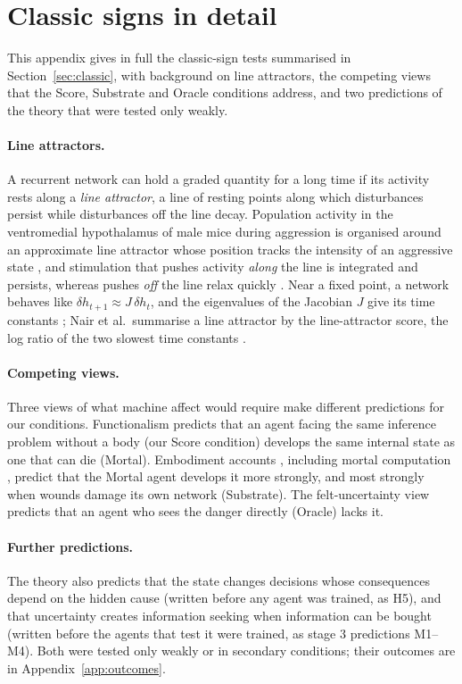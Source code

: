 \documentclass[11pt]{article}
\begin{document}
\section{Classic signs in detail}
\label{app:classic}

This appendix gives in full the classic-sign tests summarised in Section~\ref{sec:classic}, with background on line attractors, the competing views that the Score, Substrate and Oracle conditions address, and two predictions of the theory that were tested only weakly.

\paragraph{Line attractors.} A recurrent network can hold a graded quantity for a long time if its activity rests along a \emph{line attractor}, a line of resting points along which disturbances persist while disturbances off the line decay. Population activity in the ventromedial hypothalamus of male mice during aggression is organised around an approximate line attractor whose position tracks the intensity of an aggressive state \cite{nair2023line}, and stimulation that pushes activity \emph{along} the line is integrated and persists, whereas pushes \emph{off} the line relax quickly \cite{vinograd2024causal}. Near a fixed point, a network behaves like $\delta h_{t+1}\approx J\,\delta h_t$, and the eigenvalues of the Jacobian $J$ give its time constants \cite{sussillo2013opening}; Nair et al.\ summarise a line attractor by the line-attractor score, the log ratio of the two slowest time constants \cite{nair2023line}.

\paragraph{Competing views.} Three views of what machine affect would require make different predictions for our conditions. Functionalism predicts that an agent facing the same inference problem without a body (our Score condition) develops the same internal state as one that can die (Mortal). Embodiment accounts \cite{damasio1994descartes,seth2016active,man2019homeostasis}, including mortal computation \cite{ororbia2023mortal}, predict that the Mortal agent develops it more strongly, and most strongly when wounds damage its own network (Substrate). The felt-uncertainty view \cite{solms2026inferring} predicts that an agent who sees the danger directly (Oracle) lacks it.

\paragraph{Further predictions.} The theory also predicts that the state changes decisions whose consequences depend on the hidden cause (written before any agent was trained, as H5), and that uncertainty creates information seeking when information can be bought (written before the agents that test it were trained, as stage 3 predictions M1--M4). Both were tested only weakly or in secondary conditions; their outcomes are in Appendix~\ref{app:outcomes}.
\end{document}
